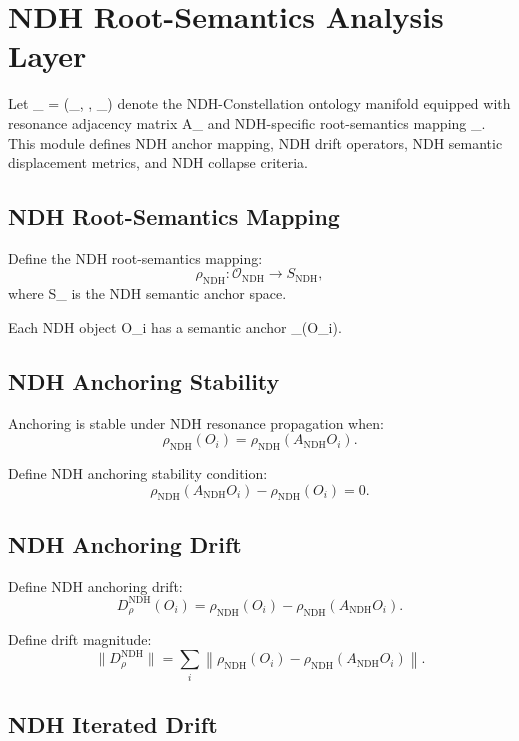 \section{NDH Root-Semantics Analysis Layer}

Let _{} = (_{}, ,
\rho_{}) denote the NDH-Constellation ontology manifold equipped
with resonance adjacency matrix A_{} and NDH-specific
root-semantics mapping \rho_{}. This module defines NDH anchor
mapping, NDH drift operators, NDH semantic displacement metrics, and NDH
collapse criteria.

\subsection{NDH Root-Semantics Mapping}

Define the NDH root-semantics mapping:
\[
\rho_{\mathrm{NDH}} : \mathcal{O}_{\mathrm{NDH}} \to S_{\mathrm{NDH}},
\]
where S_{} is the NDH semantic anchor space.

Each NDH object O_i has a semantic anchor \rho_{}(O_i).

\subsection{NDH Anchoring Stability}

Anchoring is stable under NDH resonance propagation when:
\[
\rho_{\mathrm{NDH}}(O_i) = \rho_{\mathrm{NDH}}(A_{\mathrm{NDH}} O_i).
\]

Define NDH anchoring stability condition:
\[
\rho_{\mathrm{NDH}}(A_{\mathrm{NDH}} O_i) - \rho_{\mathrm{NDH}}(O_i) = 0.
\]

\subsection{NDH Anchoring Drift}

Define NDH anchoring drift:
\[
D_{\rho}^{\mathrm{NDH}}(O_i)
  = \rho_{\mathrm{NDH}}(O_i) - \rho_{\mathrm{NDH}}(A_{\mathrm{NDH}} O_i).
\]

Define drift magnitude:
\[
\|D_{\rho}^{\mathrm{NDH}}\|
  = \sum_i \left\| \rho_{\mathrm{NDH}}(O_i)
  - \rho_{\mathrm{NDH}}(A_{\mathrm{NDH}} O_i) \right\|.
\]

\subsection{NDH Iterated Drift}

